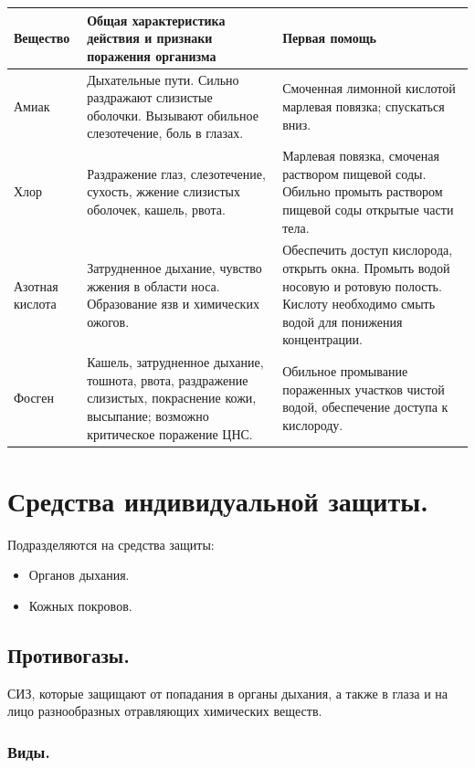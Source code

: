 \documentclass[12pt]{article}
\begin{document}
	\begin{xltabular}{\textwidth}{|X|X|X|}
		\hline
		\textbf{Вещество} & \textbf{Общая характеристика действия и признаки поражения организма} & \textbf{Первая помощь}\\
		\hline
		Амиак & Дыхательные пути. Сильно раздражают слизистые оболочки. Вызывают обильное слезотечение, боль в глазах. & Смоченная лимонной кислотой марлевая повязка; спускаться вниз.\\
		\hline
		Хлор & Раздражение глаз, слезотечение, сухость, жжение слизистых оболочек, кашель, рвота. & Марлевая повязка, смоченая раствором пищевой соды. Обильно промыть раствором пищевой соды открытые части тела.\\
		\hline
		Азотная кислота & Затрудненное дыхание, чувство жжения в области носа. Образование язв и химических ожогов. & Обеспечить доступ кислорода, открыть окна. Промыть водой носовую и ротовую полость. Кислоту необходимо смыть водой для понижения концентрации.\\
		\hline
		Фосген & Кашель, затрудненное дыхание, тошнота, рвота, раздражение слизистых, покраснение кожи, высыпание; возможно критическое поражение ЦНС. & Обильное промывание пораженных участков чистой водой, обеспечение доступа к кислороду.\\
		\hline
	\end{xltabular}
	
	\section{Средства индивидуальной защиты.}
	
	Подразделяются на средства защиты:
	\begin{itemize}
		\item Органов дыхания.
		\item Кожных покровов.
	\end{itemize}
	
	\subsection{Противогазы.}
	
	\begin{definition}[Противогазы]
		СИЗ, которые защищают от попадания в органы дыхания, а также в глаза и на лицо разнообразных отравляющих химических веществ.
	\end{definition}
	
	\subsubsection{Виды.}
	
\end{document}
